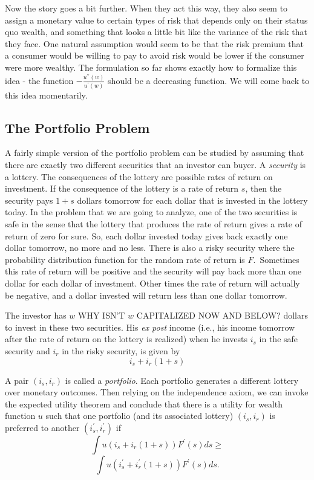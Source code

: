 \documentclass[12pt]{article}
\begin{document}
Now the story goes a bit further. When they act this way, they also seem to
assign a monetary value to certain types of risk that depends only on their
status quo wealth, and something that looks a little bit like the variance of
the risk that they face. One natural assumption would seem to be that the risk
premium that a consumer would be willing to pay to avoid risk would be lower
if the consumer were more wealthy. The formulation so far shows exactly how to
formalize this idea - the function $-\frac{u^{\prime\prime}\left(  w\right)
}{u^{\prime}\left(  w\right)  }$ should be a decreasing function. We will come
back to this idea momentarily.

\subsection{The Portfolio Problem}

A fairly simple version of the portfolio problem can be studied by assuming
that there are exactly two different securities that an investor can buyer. A
\emph{security} is a lottery. The consequences of the lottery are possible
rates of return on investment. If the consequence of the lottery is a rate of
return $s$, then the security pays $1+s$ dollars tomorrow for each dollar that
is invested in the lottery today. In the problem that we are going to analyze,
one of the two securities is safe in the sense that the lottery that produces
the rate of return gives a rate of return of zero for sure. So, each dollar
invested today gives back exactly one dollar tomorrow, no more and no less.
There is also a risky security where the probability distribution function for
the random rate of return is $F$.\ Sometimes this rate of return will be
positive and the security will pay back more than one dollar for each dollar
of investment. Other times the rate of return will actually be negative, and a
dollar invested will return less than one dollar tomorrow.

The investor has $w$ WHY ISN'T $w$ CAPITALIZED NOW AND BELOW?  dollars to invest in these two securities. His \emph{ex
post} income (i.e., his income tomorrow after the rate of return on the
lottery is realized) when he invests $i_{s}$ in the safe security and $i_{r}$
in the risky security, is given by%
\[
i_{s}+i_{r}\left(  1+s\right)
\]

A pair $\left(  i_{s},i_{r}\right)  $ is called a \emph{portfolio}. Each
portfolio generates a different lottery over monetary outcomes. Then relying
on the independence axiom, we can invoke the expected utility theorem and
conclude that there is a utility for wealth function $u$ such that one
portfolio (and its associated lottery) $\left(  i_{s},i_{r}\right)  $ is
preferred to another $\left(  i_{s}^{\prime},i_{r}^{\prime}\right)  $ if%
\[
\int u\left(  i_{s}+i_{r}\left(  1+s\right)  \right)  F^{\prime}\left(
s\right)  ds\geq
\]%
\[
\int u\left(  i_{s}^{\prime}+i_{r}^{\prime}\left(  1+s\right)  \right)
F^{\prime}\left(  s\right)  ds.
\]
\end{document}

